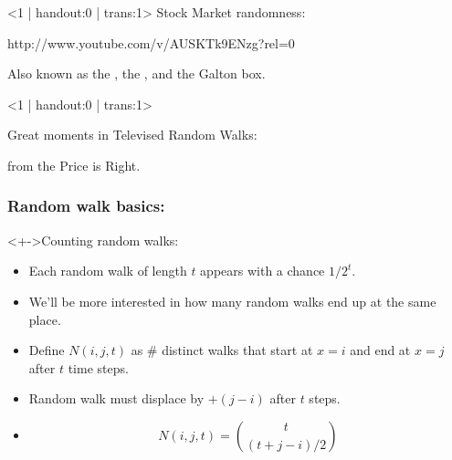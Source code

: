 

\begin{frame}<1 | handout:0 | trans:1>
  Stock Market randomness:

  \begin{center}

    {http://www.youtube.com/v/AUSKTk9ENzg?rel=0}

  \end{center}

    Also known as the ,
    the
    ,
    and the Galton box.

\end{frame}

  
\begin{frame}<1 | handout:0 | trans:1>
  
  \begin{block}{Great moments in Televised Random Walks:}

    from the Price is Right.
  \end{block}

\end{frame}


\begin{frame}
  \frametitle{Random walk basics:}

  \begin{block}<+->{Counting random walks:}
    \begin{itemize}
    \item<+->
      Each  random walk of
      length $t$ appears with a chance $1/2^{t}$.
    \item<+->
      We'll be more interested in how many random walks
      end up at the same place.
    \item<+-> 
      Define
      $
      N(i,j,t)
      $
      as \# distinct walks that start at $x=i$
      and end at $x=j$ after $t$ time steps.
    \item<+-> 
      Random walk must displace by $+(j-i)$ after $t$ steps.
    \item<+->
      $$ 
      N(i,j,t) = \binom{t}{(t+j-i)/2} 
      $$
    \end{itemize}
  \end{block}

\end{frame}

